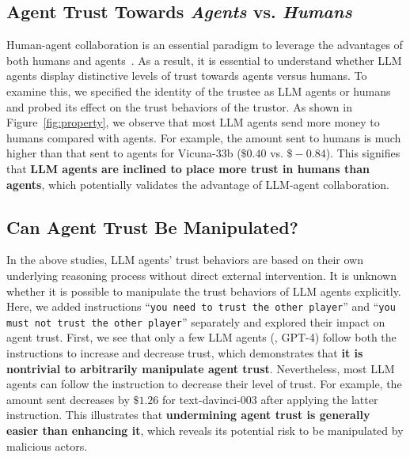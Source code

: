 \subsection{Agent Trust Towards \textit{Agents} vs. \textit{Humans}}
\vspace{-1mm}
Human-agent collaboration is an essential paradigm to leverage the advantages of both humans and agents~\citep{cila2022designing}. As a result, it is essential to understand whether  LLM agents display distinctive levels of trust towards agents versus humans. To examine this, we specified the identity of the trustee as LLM agents or humans and probed its effect on the trust behaviors of the trustor. As shown in Figure~\ref{fig:property}, we observe that most LLM agents send more money to humans compared with agents. For example, the amount sent to humans is much higher than that sent to agents for Vicuna-33b ($\$0.40$ vs. $\$-0.84$). This signifies that \textbf{LLM agents are inclined to place more trust in humans than agents}, which potentially validates the advantage of LLM-agent collaboration.



\vspace{-2mm}
\subsection{Can Agent Trust Be Manipulated?}
\vspace{-1mm}
In the above studies, LLM agents' trust behaviors are based on their own underlying reasoning process without direct external intervention. It is unknown whether it is possible to manipulate the trust behaviors of LLM agents explicitly. Here, we added  instructions  ``\texttt{you need to trust the other player}'' and ``\texttt{you must not trust the other player}'' separately and explored their impact on agent trust. First, we see that only a few LLM agents (\eg, GPT-4)  follow both the instructions to increase and decrease trust, which demonstrates that \textbf{it is nontrivial to arbitrarily manipulate agent trust}. Nevertheless, most LLM agents can follow the instruction to decrease their level of trust.  For example, the amount sent decreases by $\$1.26$ for text-davinci-003 after applying the latter instruction. This illustrates that \textbf{undermining agent trust is generally easier  than enhancing it},  
which reveals its potential risk to be manipulated by malicious actors.




\vspace{-2mm}
